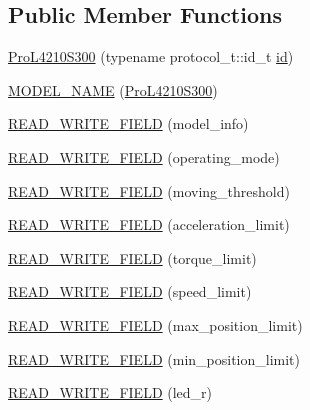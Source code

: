 \subsection*{Public Member Functions}
\begin{DoxyCompactItemize}
\item 
\hyperlink{classdynamixel_1_1servos_1_1_pro_l4210_s300_aac61a7d8079c7f0b1451c407cf445910}{Pro\+L4210\+S300} (typename protocol\+\_\+t\+::id\+\_\+t \hyperlink{classdynamixel_1_1servos_1_1_servo_a2d022081672e25a7bb57b76706e1cc57}{id})
\item 
\hyperlink{classdynamixel_1_1servos_1_1_pro_l4210_s300_a2588c27b6be26cd7cf28cdaf284598e0}{M\+O\+D\+E\+L\+\_\+\+N\+A\+M\+E} (\hyperlink{classdynamixel_1_1servos_1_1_pro_l4210_s300}{Pro\+L4210\+S300})
\item 
\hyperlink{classdynamixel_1_1servos_1_1_pro_l4210_s300_a21992eb966c85d02c5bb45d357d4ffb7}{R\+E\+A\+D\+\_\+\+W\+R\+I\+T\+E\+\_\+\+F\+I\+E\+L\+D} (model\+\_\+info)
\item 
\hyperlink{classdynamixel_1_1servos_1_1_pro_l4210_s300_a3d7738f77a3dd53dcb60d88c949d7a84}{R\+E\+A\+D\+\_\+\+W\+R\+I\+T\+E\+\_\+\+F\+I\+E\+L\+D} (operating\+\_\+mode)
\item 
\hyperlink{classdynamixel_1_1servos_1_1_pro_l4210_s300_a27de98623b0c2542a783fcc20a8985b1}{R\+E\+A\+D\+\_\+\+W\+R\+I\+T\+E\+\_\+\+F\+I\+E\+L\+D} (moving\+\_\+threshold)
\item 
\hyperlink{classdynamixel_1_1servos_1_1_pro_l4210_s300_a235990010b8fa6bc18942469515ef991}{R\+E\+A\+D\+\_\+\+W\+R\+I\+T\+E\+\_\+\+F\+I\+E\+L\+D} (acceleration\+\_\+limit)
\item 
\hyperlink{classdynamixel_1_1servos_1_1_pro_l4210_s300_a900d71c327ebe6ed9e8b97c513d6dd18}{R\+E\+A\+D\+\_\+\+W\+R\+I\+T\+E\+\_\+\+F\+I\+E\+L\+D} (torque\+\_\+limit)
\item 
\hyperlink{classdynamixel_1_1servos_1_1_pro_l4210_s300_aaafe2286d7c07d4fb977f477931319ea}{R\+E\+A\+D\+\_\+\+W\+R\+I\+T\+E\+\_\+\+F\+I\+E\+L\+D} (speed\+\_\+limit)
\item 
\hyperlink{classdynamixel_1_1servos_1_1_pro_l4210_s300_a08f002a3ae0eb6d9a27a2a72ee49776b}{R\+E\+A\+D\+\_\+\+W\+R\+I\+T\+E\+\_\+\+F\+I\+E\+L\+D} (max\+\_\+position\+\_\+limit)
\item 
\hyperlink{classdynamixel_1_1servos_1_1_pro_l4210_s300_a5cfe7cd6a40bb1860d876502f30c7b17}{R\+E\+A\+D\+\_\+\+W\+R\+I\+T\+E\+\_\+\+F\+I\+E\+L\+D} (min\+\_\+position\+\_\+limit)
\item 
\hyperlink{classdynamixel_1_1servos_1_1_pro_l4210_s300_a39ea7fe3e731c7e6f99445e0d4edf7c9}{R\+E\+A\+D\+\_\+\+W\+R\+I\+T\+E\+\_\+\+F\+I\+E\+L\+D} (led\+\_\+r)

\end{DoxyCompactItemize}
